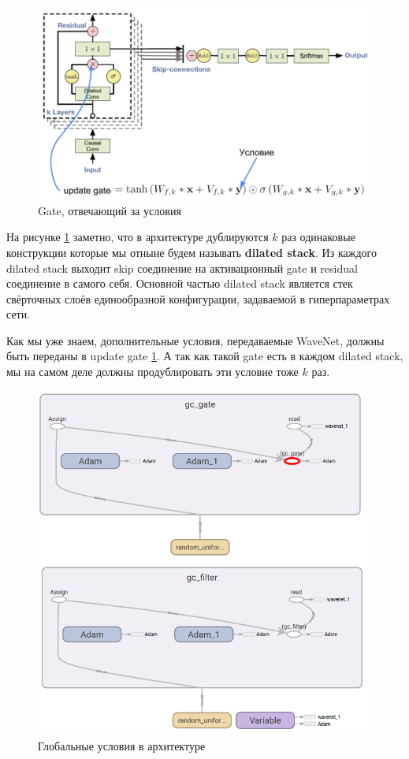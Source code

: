 \documentclass[../diploma.tex]{subfiles}
\begin{document}
\begin{figure}[!htbp]
  \centering
  \includegraphics[scale=0.35]{img/wavenet_arrow}
  \caption{Gate, отвечающий за условия}
  \label{fig:wavenet_arrow}
\end{figure}

На рисунке \ref{fig:wavenet_arrow} заметно, что в архитектуре дублируются $k$ раз одинаковые конструкции которые мы отныне будем называть \textbf{dilated stack}. Из каждого dilated stack выходит skip соединение на активационный gate и residual соединение в самого себя. Основной частью dilated stack является стек свёрточных слоёв единообразной конфигурации, задаваемой в гиперпараметрах сети.

Как мы уже знаем, дополнительные условия, передаваемые WaveNet, должны быть переданы в update gate \ref{fig:wavenet_arrow}. А так как такой gate есть в каждом dilated stack, мы на самом деле должны продублировать эти условие тоже $k$ раз.

\begin{figure}[!htbp]
  \centering
  \includegraphics[scale=1]{img/gc}
  \caption{Глобальные условия в архитектуре}
  \label{fig:gc}
\end{figure}
\end{document}
